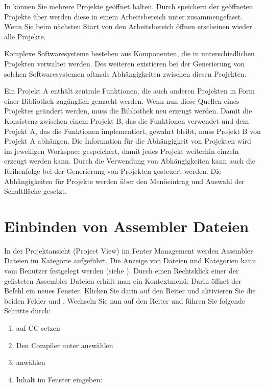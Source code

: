 In \codeblocks können Sie mehrere Projekte geöffnet halten. Durch speichern der geöffneten Projekte über  werden diese in einem Arbeitsbereich unter  zusammengefasst. Wenn Sie beim nächsten Start von \codeblocks den Arbeitsbereich  öffnen erscheinen wieder alle Projekte.

Komplexe Softwaresysteme bestehen aus Komponenten, die in unterschiedlichen \codeblocks Projekten verwaltet werden. Des weiteren existieren bei der Generierung von solchen Softwaresystemen oftmals Abhängigkeiten zwischen diesen Projekten.


Ein Projekt A enthält zentrale Funktionen, die auch anderen Projekten in Form einer Bibliothek zugänglich gemacht werden. Wenn nun diese Quellen eines Projektes geändert werden, muss die Bibliothek neu erzeugt werden. Damit die Konsistenz zwischen einem Projekt B, das die Funktionen verwendet und dem Projekt A, das die Funktionen implementiert, gewahrt bleibt, muss Projekt B von Projekt A abhängen. Die Information für die Abhängigkeit von Projekten wird im jeweiligen Workspace gespeichert, damit jedes Projekt weiterhin einzeln erzeugt werden kann. Durch die Verwendung von Abhängigkeiten kann auch die Reihenfolge bei der Generierung von Projekten gesteuert werden. Die Abhängigkeiten für Projekte werden über den Menüeintrag  und Auswahl der Schaltfläche  gesetzt.

\section{Einbinden von Assembler Dateien}

In der Projektansicht (Project View) im Fenter Management werden Assembler Dateien im Kategorie  aufgeführt. Die Anzeige von Dateien und Kategorien kann vom Benutzer festgelegt werden (siehe ). Durch einen Rechtsklick einer der gelisteten Assembler Dateien erhält man ein Kontextmenü. Darin öffnet der Befehl  ein neues Fenster. Klicken Sie darin auf den Reiter  und aktivieren Sie die beiden Felder  und . Wechseln Sie nun auf den Reiter  und führen Sie folgende Schritte durch:

\begin{enumerate}
\item {} auf CC setzen
\item Den Compiler unter  auswählen
\item {} anwählen
\item Inhalt im Fenster eingeben:
\end{enumerate}

